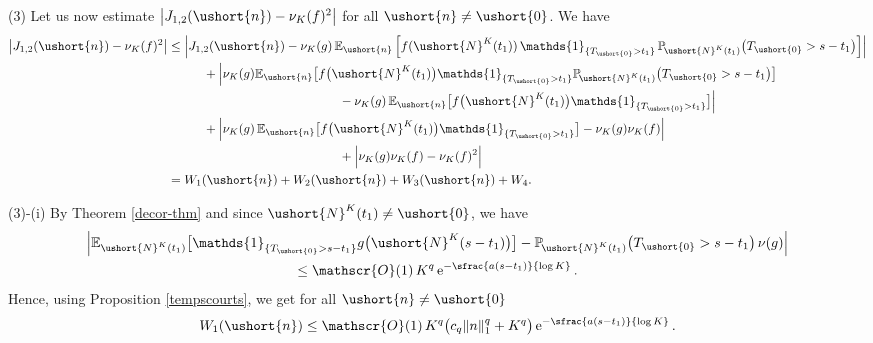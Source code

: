 \documentclass[JEP,XML,SOM,Unicode]{cedram}
\let\mathcal\mathscr
\numberwithin{equation}{section}
\theoremstyle{plain}
\theoremstyle{definition}
\newcommand{\proba}{{\mathbb{P}}}
\newcommand{\E}{{\mathbb{E}}}
\newcommand{\Oun}{\mathcal{O}(1)}
\newcommand{\un}{\mathds{1}}
\newcommand{\vecn}{\ushort{n}}
\newcommand{\veczer}{\ushort{0}}
\newcommand{\leproc}{\ushort{N}^{K}}
\newcommand{\sleproc}{\ushort{N}^{K}}
\newcommand{\nuk}{\nu_{K}}\let\snuk\nuk
\newcommand{\e}{\operatorname{e}}
\newcommand{\norm}[1]{\|#1\|_{1}}\let\snorm\norm
\begin{document}
(3)
Let us now estimate $\left| J_{1,2}(\vecn) -\nuk(f)^2\right|$ for all $\vecn\neq \veczer$.
We have
\begin{align*}
\left|J_{1,2}(\vecn) -\nuk(f)^2\right| &\leq \Bigl|J_{1,2}(\vecn)
-\nuk(g)\, \E_{\vecn}\,\Bigl[f(\leproc(t_1)) \, \un_{\{T_{\veczer} >t_1\}} \, \proba_{\!\sleproc(t_{1})}\bigl(T_{\veczer} >s-t_1\bigr)\Bigr]\Bigr|\\
& \hspace*{1cm}+ \Bigl|\nuk(g) \E_{\vecn}\bigl[f\bigl(\leproc(t_{1})\bigr)\un_{\{T_{\veczer}>t_{1}\}}
\proba_{\!\sleproc(t_{1})}\bigl(T_{\veczer}>s-t_{1}\bigr)\bigr]\\
&\hspace*{4.8cm}-\nuk(g) \,\E_{\vecn}\bigl[f\bigl(\leproc(t_{1})\bigr)\un_{\{T_{\veczer}>t_{1}\}}\bigr] \Bigr|\\
& \hspace*{1cm}+ \Bigl | \nuk(g)\,\E_{\vecn}\bigl[f\bigl(\leproc(t_{1})\bigr)
\un_{\{T_{\veczer}>t_{1}\}}\bigr]-\nuk(g)\nuk(f) \Bigr|\\
&\hspace*{4.8cm}+ \Bigl|\nuk(g)\nuk(f) - \nuk(f)^2 \Bigr|\\
&= W_{1}(\vecn)+W_{2}(\vecn)+W_{3}(\vecn)+W_{4}.
\end{align*}

(3)-(i) By Theorem \ref{decor-thm} and since $\leproc(t_1)\neq \veczer$, we have
\begin{multline*}
\Big|
\E_{\sleproc(t_{1})} \bigl[\un_{\{T_{\veczer} >s-t_1\}}g\bigl(\leproc(s-t_1)\bigr)\bigr]
- \proba_{\!\leproc(t_{1})}\bigl(T_{\veczer} >s-t_1\bigr)\, \nu(g)
\Big|\\
\leq \Oun\, K^q \e^{-\sfrac{a(s-t_{1})}{\log K}}.
\end{multline*}
Hence, using Proposition \ref{tempscourts}, we get for all $\vecn\neq \veczer$
\[
W_{1}(\vecn)\leq
\Oun \, K^q \bigl(c_q \norm{n}^{q} + K^q\bigr) \e^{- \sfrac{a(s-t_{1})}{\log K}}.
\]
\end{document}
